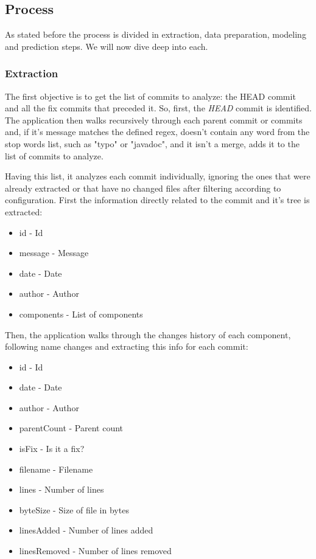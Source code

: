 \subsection{Process}

As stated before the process is divided in extraction, data preparation, modeling and prediction steps. We will now dive deep into each.

\subsubsection{Extraction}

The first objective is to get the list of commits to analyze: the HEAD commit and all the fix commits that preceded it. 
So, first, the \emph{HEAD} commit is identified. The application then walks recursively through each parent commit or commits and,
if it's message matches the defined regex, doesn't contain any word from the stop words list, such as "typo" or "javadoc", and it isn't a merge, adds it to the list of commits to analyze.


Having this list, it analyzes each commit individually, ignoring the ones that were already extracted or that have no changed files after filtering
according to configuration.
First the information directly related to the commit and it's tree is extracted:
%
\begin{itemize}
\item id - Id
\item message - Message
\item date - Date
\item author - Author
\item components - List of components
\end{itemize}

Then, the application walks through the changes history of each component, following name changes and extracting this info for each commit:
%
\begin{itemize}
\item id - Id
\item date - Date
\item author - Author
\item parentCount - Parent count
\item isFix - Is it a fix?
\item filename - Filename
\item lines - Number of lines
\item byteSize - Size of file in bytes
\item linesAdded - Number of lines added
\item linesRemoved - Number of lines removed
\end{itemize}

